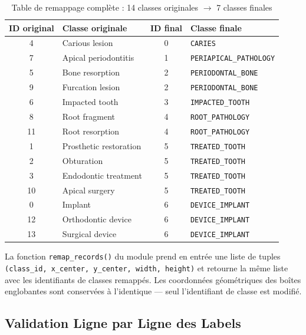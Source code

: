 \documentclass{rapportENSIAS}
\begin{document}
\begin{table}[H]
\centering
\caption{Table de remappage complète : 14 classes originales $\rightarrow$ 7 classes finales}
\label{tab:remap_complet}
\begin{tabular}{clcl}
\toprule
\textbf{ID original} & \textbf{Classe originale} & \textbf{ID final} & \textbf{Classe finale} \\
\midrule
4  & Carious lesion          & 0 & \texttt{CARIES} \\
\midrule
7  & Apical periodontitis    & 1 & \texttt{PERIAPICAL\_PATHOLOGY} \\
\midrule
5  & Bone resorption         & 2 & \texttt{PERIODONTAL\_BONE} \\
9  & Furcation lesion        & 2 & \texttt{PERIODONTAL\_BONE} \\
\midrule
6  & Impacted tooth          & 3 & \texttt{IMPACTED\_TOOTH} \\
\midrule
8  & Root fragment           & 4 & \texttt{ROOT\_PATHOLOGY} \\
11 & Root resorption         & 4 & \texttt{ROOT\_PATHOLOGY} \\
\midrule
1  & Prosthetic restoration  & 5 & \texttt{TREATED\_TOOTH} \\
2  & Obturation              & 5 & \texttt{TREATED\_TOOTH} \\
3  & Endodontic treatment    & 5 & \texttt{TREATED\_TOOTH} \\
10 & Apical surgery          & 5 & \texttt{TREATED\_TOOTH} \\
\midrule
0  & Implant                 & 6 & \texttt{DEVICE\_IMPLANT} \\
12 & Orthodontic device      & 6 & \texttt{DEVICE\_IMPLANT} \\
13 & Surgical device         & 6 & \texttt{DEVICE\_IMPLANT} \\
\bottomrule
\end{tabular}
\end{table}

La fonction \texttt{remap\_records()} du module prend en entrée une liste de
tuples \texttt{(class\_id, x\_center, y\_center, width, height)} et retourne
la même liste avec les identifiants de classes remappés. Les coordonnées
géométriques des boîtes englobantes sont conservées à l'identique — seul
l'identifiant de classe est modifié.

\subsection{Validation Ligne par Ligne des Labels}
\end{document}
